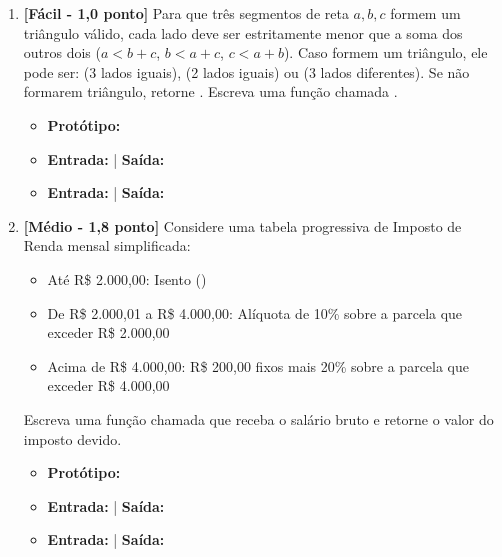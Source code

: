 \begin{enumerate}[label=\textbf{Q\arabic*.}, start=11]
\item \textbf{[Fácil - 1,0 ponto]} Para que três segmentos de reta $a, b, c$ formem um triângulo válido, cada lado deve ser estritamente menor que a soma dos outros dois ($a < b + c$, $b < a + c$, $c < a + b$). Caso formem um triângulo, ele pode ser:  (3 lados iguais),  (2 lados iguais) ou  (3 lados diferentes). Se não formarem triângulo, retorne . Escreva uma função chamada .

\begin{itemize}[leftmargin=*]
    \item \textbf{Protótipo:}\newline {}
    \item \textbf{Entrada:}  | \textbf{Saída:} 
    \item \textbf{Entrada:}  | \textbf{Saída:} 
\end{itemize}



\vspace{0.4cm}

\item \textbf{[Médio - 1,8 ponto]} Considere uma tabela progressiva de Imposto de Renda mensal simplificada:
\begin{itemize}
    \item Até R\$ 2.000,00: Isento ()
    \item De R\$ 2.000,01 a R\$ 4.000,00: Alíquota de 10\% sobre a parcela que exceder R\$ 2.000,00
    \item Acima de R\$ 4.000,00: R\$ 200,00 fixos mais 20\% sobre a parcela que exceder R\$ 4.000,00
\end{itemize}
Escreva uma função chamada  que receba o salário bruto e retorne o valor do imposto devido.

\begin{itemize}[leftmargin=*]
    \item \textbf{Protótipo:}\newline {}
    \item \textbf{Entrada:}  | \textbf{Saída:} 
    \item \textbf{Entrada:}  | \textbf{Saída:} 
\end{itemize}


\end{enumerate}

